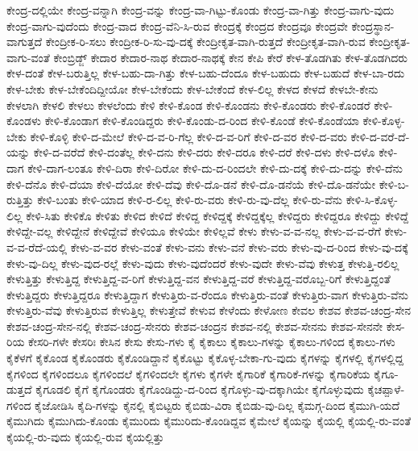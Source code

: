 {ಕೇಂದ್ರ-ದಲ್ಲಿಯೇ
ಕೇಂದ್ರ-ವನ್ನಾಗಿ
ಕೇಂದ್ರ-ವನ್ನು
ಕೇಂದ್ರ-ವಾ-ಗಿಟ್ಟು-ಕೊಂಡು
ಕೇಂದ್ರ-ವಾ-ಗಿತ್ತು
ಕೇಂದ್ರ-ವಾಗು-ವುದು
ಕೇಂದ್ರ-ವಾಗು-ವುದೆಂದು
ಕೇಂದ್ರ-ವಾದ
ಕೇಂದ್ರ-ವೆನಿ-ಸಿ-ರುವ
ಕೇಂದ್ರಕ್ಕೆ
ಕೇಂದ್ರದ
ಕೇಂದ್ರವೂ
ಕೇಂದ್ರವೇ
ಕೇಂದ್ರಸ್ಥಾನ-ವಾಗುತ್ತದೆ
ಕೇಂದ್ರೀಕ-ರಿ-ಸಲು
ಕೇಂದ್ರೀಕ-ರಿ-ಸು-ವು-ದಕ್ಕೆ
ಕೇಂದ್ರೀಕೃತ-ವಾಗಿ-ರುತ್ತದೆ
ಕೇಂದ್ರೀಕೃತ-ವಾಗಿ-ರುವ
ಕೇಂದ್ರೀಕೃತ-ವಾಗು-ವಂತೆ
ಕೇಂಬ್ರಿಡ್ಜ್
ಕೇದಾರ
ಕೇದಾರ-ನಾಥ
ಕೇದಾರ-ನಾಥಕ್ಕೆ
ಕೇನ
ಕೇಪಿ
ಕೇರೆ
ಕೇಳ-ತೊಡಗಿತು
ಕೇಳ-ತೊಡಗಿದರು
ಕೇಳ-ದಂತೆ
ಕೇಳ-ಬರುತ್ತಿಲ್ಲ
ಕೇಳ-ಬಹು-ದಾ-ಗಿತ್ತು
ಕೇಳ-ಬಹು-ದೆಂದೂ
ಕೇಳ-ಬಹುದು
ಕೇಳ-ಬಹುದೆ
ಕೇಳ-ಬಾ-ರದು
ಕೇಳ-ಬೇಕು
ಕೇಳ-ಬೇಕೆಂದಿದ್ದೀಯೋ
ಕೇಳ-ಬೇಕೆಂದು
ಕೇಳ-ಬೇಕೆಂದೆ
ಕೇಳ-ಲಿಲ್ಲ
ಕೇಳದ
ಕೇಳದೆ
ಕೇಳಬೇ-ಕೇನು
ಕೇಳಲಾಗಿ
ಕೇಳಲಿ
ಕೇಳಲು
ಕೇಳಲೆಂದು
ಕೇಳಿ
ಕೇಳಿ-ಕೊಂಡ
ಕೇಳಿ-ಕೊಂಡನು
ಕೇಳಿ-ಕೊಂಡರು
ಕೇಳಿ-ಕೊಂಡರೆ
ಕೇಳಿ-ಕೊಂಡಳು
ಕೇಳಿ-ಕೊಂಡಾಗ
ಕೇಳಿ-ಕೊಂಡಿದ್ದರು
ಕೇಳಿ-ಕೊಂಡು-ದ-ರಿಂದ
ಕೇಳಿ-ಕೊಂಡೆ
ಕೇಳಿ-ಕೊಂಡೆಯಾ
ಕೇಳಿ-ಕೊಳ್ಳ-ಬೇಕು
ಕೇಳಿ-ಕೊಳ್ಳಿ
ಕೇಳಿ-ದ-ಮೇಲೆ
ಕೇಳಿ-ದ-ವ-ರಿ-ಗೆಲ್ಲ
ಕೇಳಿ-ದ-ವ-ರಿಗೆ
ಕೇಳಿ-ದ-ವರ
ಕೇಳಿ-ದ-ವರು
ಕೇಳಿ-ದ-ವರೆ-ದೆ-ಯನ್ನು
ಕೇಳಿ-ದ-ವರೆದೆ
ಕೇಳಿ-ದಂತೆಲ್ಲ
ಕೇಳಿ-ದನು
ಕೇಳಿ-ದರು
ಕೇಳಿ-ದರೂ
ಕೇಳಿ-ದರೆ
ಕೇಳಿ-ದಳು
ಕೇಳಿ-ದಳೊ
ಕೇಳಿ-ದಾಗ
ಕೇಳಿ-ದಾಗ-ಲಂತೂ
ಕೇಳಿ-ದಿರಾ
ಕೇಳಿ-ದಿರೋ
ಕೇಳಿ-ದು-ದ-ರಿಂದಲೇ
ಕೇಳಿ-ದು-ದಕ್ಕೆ
ಕೇಳಿ-ದು-ದನ್ನು
ಕೇಳಿ-ದೆನು
ಕೇಳಿ-ದೆನೊ
ಕೇಳಿ-ದೆಯಾ
ಕೇಳಿ-ದೆಯೋ
ಕೇಳಿ-ದೆವು
ಕೇಳಿ-ದೊ-ಡನೆ
ಕೇಳಿ-ದೊ-ಡನೆಯೆ
ಕೇಳಿ-ದೊ-ಡನೆಯೇ
ಕೇಳಿ-ಬ-ರುತ್ತಿತ್ತು
ಕೇಳಿ-ಬಂತು
ಕೇಳಿ-ಯಾದ
ಕೇಳಿ-ರ-ಲಿಲ್ಲ
ಕೇಳಿ-ರು-ವರು
ಕೇಳಿ-ರು-ವು-ದೆಲ್ಲ
ಕೇಳಿ-ರು-ವೆನು
ಕೇಳಿ-ಸಿ-ಕೊಳ್ಳ-ಲಿಲ್ಲ
ಕೇಳಿ-ಸಿತು
ಕೇಳಿಕೊ
ಕೇಳಿತು
ಕೇಳಿದ
ಕೇಳಿದೆ
ಕೇಳಿದ್ದ
ಕೇಳಿದ್ದಕ್ಕೆ
ಕೇಳಿದ್ದಕ್ಕೆಲ್ಲ
ಕೇಳಿದ್ದರು
ಕೇಳಿದ್ದರೂ
ಕೇಳಿದ್ದು
ಕೇಳಿದ್ದೆ
ಕೇಳಿದ್ದೇ-ವಲ್ಲ
ಕೇಳಿದ್ದೇನೆ
ಕೇಳಿದ್ದೇವೆ
ಕೇಳಿಯೂ
ಕೇಳಿಯೇ
ಕೇಳಿಲ್ಲವೆ
ಕೇಳು
ಕೇಳು-ವ-ವ-ನಲ್ಲ
ಕೇಳು-ವ-ವ-ರೆಗೆ
ಕೇಳು-ವ-ವ-ರೆದೆ-ಯಲ್ಲಿ
ಕೇಳು-ವ-ವರ
ಕೇಳು-ವಂತೆ
ಕೇಳು-ವನು
ಕೇಳು-ವನೆ
ಕೇಳು-ವರು
ಕೇಳು-ವು-ದ-ರಿಂದ
ಕೇಳು-ವು-ದಕ್ಕೆ
ಕೇಳು-ವು-ದಿಲ್ಲ
ಕೇಳು-ವುದ-ರಲ್ಲೆ
ಕೇಳು-ವುದು
ಕೇಳು-ವುದೆಂದರೆ
ಕೇಳು-ವುದೇ
ಕೇಳು-ವೆವು
ಕೇಳುತ್ತ
ಕೇಳುತ್ತಿ-ರಲಿಲ್ಲ
ಕೇಳುತ್ತಿತ್ತು
ಕೇಳುತ್ತಿದ್ದ
ಕೇಳುತ್ತಿದ್ದ-ವ-ರಿಗೆ
ಕೇಳುತ್ತಿದ್ದ-ವನ
ಕೇಳುತ್ತಿದ್ದ-ವರೆ
ಕೇಳುತ್ತಿದ್ದ-ವರೊಬ್ಬ-ರಿಗೆ
ಕೇಳುತ್ತಿದ್ದಂತೆ
ಕೇಳುತ್ತಿದ್ದರು
ಕೇಳುತ್ತಿದ್ದರೂ
ಕೇಳುತ್ತಿದ್ದಾಗ
ಕೇಳುತ್ತಿರು-ವ-ರೆಂದೂ
ಕೇಳುತ್ತಿರು-ವಂತೆ
ಕೇಳುತ್ತಿರು-ವಾಗ
ಕೇಳುತ್ತಿರು-ವೆನು
ಕೇಳುತ್ತಿರು-ವೆವು
ಕೇಳುತ್ತಿರುವ
ಕೇಳುತ್ತಿಲ್ಲ
ಕೇಳುತ್ತೇವೆ
ಕೇಳುವ
ಕೇಳೆಂದು
ಕೇಳೋಣ
ಕೇವಲ
ಕೇಶವ
ಕೇಶವ-ಚಂದ್ರ-ಸೇನ
ಕೇಶವ-ಚಂದ್ರ-ಸೇನ-ನಲ್ಲಿ
ಕೇಶವ-ಚಂದ್ರ-ಸೇನರು
ಕೇಶವ-ಚಂದ್ರನ
ಕೇಶವ-ನಲ್ಲಿ
ಕೇಶವ-ಸೇನನು
ಕೇಶವ-ಸೇನನೇ
ಕೇಸ-ರಿಯ
ಕೇಸರಿ-ಗಳೇ
ಕೇಸರಿಃ
ಕೇಸಿನ
ಕೇಸು
ಕೇಸು-ಗಳು
ಕೈ
ಕೈಕಾಲು
ಕೈಕಾಲು-ಗಳನ್ನು
ಕೈಕಾಲು-ಗಳಿಂದ
ಕೈಕಾಲು-ಗಳು
ಕೈಕೆಳಗೆ
ಕೈಕೊಂಡ
ಕೈಕೊಂಡರು
ಕೈಕೊಂಡಿದ್ದಾನೆ
ಕೈಕೊಟ್ಟು
ಕೈಕೊಳ್ಳ-ಬೇಕಾ-ಗು-ವುದು
ಕೈಗಳನ್ನು
ಕೈಗಳಲ್ಲಿ
ಕೈಗಳಲ್ಲಿದ್ದ
ಕೈಗಳಿಂದ
ಕೈಗಳಿಂದಲೂ
ಕೈಗಳಿಂದಲೆ
ಕೈಗಳಿಂದಲೇ
ಕೈಗಳು
ಕೈಗಳೇ
ಕೈಗಾರಿಕೆ
ಕೈಗಾರಿಕೆ-ಗಳನ್ನು
ಕೈಗಾರಿಕೆಯ
ಕೈಗೂ-ಡುತ್ತದೆ
ಕೈಗೂಡಲಿ
ಕೈಗೆ
ಕೈಗೊಂಡರು
ಕೈಗೊಂಡಿದ್ದು-ದ-ರಿಂದ
ಕೈಗೊಳ್ಳು-ವು-ದಕ್ಕಾಗಿಯೇ
ಕೈಗೊಳ್ಳುವುದು
ಕೈಚಪ್ಪಾಳೆ-ಗಳಿಂದ
ಕೈಜೋಡಿಸಿ
ಕೈದಿ-ಗಳನ್ನು
ಕೈನಲ್ಲಿ
ಕೈಬಿಟ್ಟರು
ಕೈಬಿಡು-ವಿರಾ
ಕೈಬಿಡು-ವು-ದಿಲ್ಲ
ಕೈಮಗ್ಗ-ದಿಂದ
ಕೈಮುಗಿ-ಯದೆ
ಕೈಮುಗಿದು
ಕೈಮುಗಿದು-ಕೊಂಡು
ಕೈಮುರಿದು
ಕೈಮುರಿದು-ಕೊಂಡಿದ್ದವ
ಕೈಮೇಲೆ
ಕೈಯನ್ನು
ಕೈಯಲ್ಲಿ
ಕೈಯಲ್ಲಿ-ರು-ವಂತೆ
ಕೈಯಲ್ಲಿ-ರು-ವುದು
ಕೈಯಲ್ಲಿ-ರುವ
ಕೈಯಲ್ಲಿತ್ತು
}
